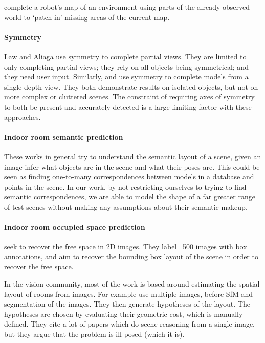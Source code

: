 \documentclass[10pt,twocolumn,letterpaper]{article}
\begin{document}
\cite{chang-tor-2007} complete a robot's map of an environment using parts of the already observed world to  `patch in' missing areas of the current map.

\paragraph{Symmetry}
Law and Aliaga \cite{law-cviu-2010} use symmetry to complete partial views. 
They are limited to only completing partial views; they rely on all objects being symmetrical; and they need user input.
Similarly, \cite{thrun-iccv-2005} and \cite{kroemer-humanoids-2012} use symmetry to complete models from a single depth view. 
They both demonstrate results on isolated objects, but not on more complex or cluttered scenes. 
The constraint of requiring axes of symmetry to both be present and accurately detected is a large limiting factor with these approaches.

\paragraph{Indoor room semantic prediction}
These works in general try to understand the semantic layout of a scene, \ie given an image infer what objects are in the scene and what their poses are.
\cite{nan-acm-2012, minkim-siggraphasia-2012}
This could be seen as finding one-to-many correspondences between models in a database and points in the scene.
In our work, by not restricting ourselves to trying to find semantic correspondences, we are able to model the shape of a far greater range of test scenes without making any assumptions about their semantic makeup.

\paragraph{Indoor room occupied space prediction}
\cite{hedau-cvpr-2012} seek to recover the free space in 2D images. They label ~500 images with box annotations, and aim to recover the bounding box layout of the scene in order to recover the free space.

In the vision community, most of the work is based around estimating the spatial layout of rooms from images.
For example \cite{bao-wacv-2014} use multiple images, before SfM and segmentation of the images. 
They then generate hypotheses of the layout. 
The hypotheses are chosen by evaluating their geometric cost, which is manually defined. 
They cite a lot of papers which do scene reasoning from a single image, but they argue that the problem is ill-posed (which it is). 
\end{document}
